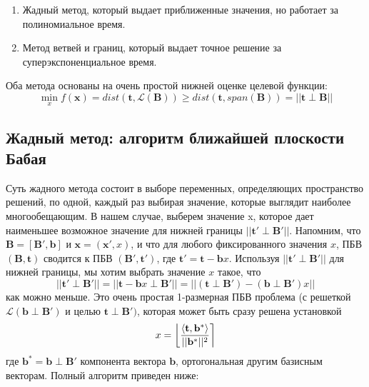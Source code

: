 \begin{enumerate}
\item Жадный метод, который выдает приближенные значения, но работает за полиномиальное время.
\item Метод ветвей и границ, который выдает точное решение за суперэкспоненциальное время.
\end{enumerate}

Оба метода основаны на очень простой нижней оценке целевой функции:
$$ \min \limits_{x}f(\mathbf{x}) = dist\left(\mathbf{t}, \mathcal{L}\left(\mathbf{B}\right)\right)\geq dist \left(\mathbf{t}, span\left(\mathbf{B}\right)\right) = ||\mathbf{t} \perp \mathbf{B} || $$

\subsection{Жадный метод: алгоритм ближайшей плоскости Бабая}

Суть жадного метода состоит в выборе переменных, определяющих пространство решений, по одной, каждый раз выбирая значение, которые выглядит наиболее многообещающим. В нашем случае, выберем значение x, которое дает наименьшее возможное значение для нижней границы $ ||\mathbf{t}' \perp \mathbf{B}' || $. Напомним, что $ \mathbf{B}=\left[\mathbf{B}', \mathbf{b}\right] $ и $ \mathbf{x}=\left(\mathbf{x}' ,x\right) $, и что для любого фиксированного значения $ x $, ПБВ $ (\mathbf{B}, \mathbf{t}) $ сводится к ПБВ $ (\mathbf{B}',\mathbf{t}') $, где $ \mathbf{t}'=\mathbf{t}-\mathbf{b}x $. Используя $ ||\mathbf{t}' \perp \mathbf{B}' || $ для нижней границы, мы хотим выбрать значение $ x $ такое, что 
$$ || \mathbf{t}' \perp \mathbf{B}' || = || \mathbf{t} - \mathbf{b}x \perp \mathbf{B}' || = || (\mathbf{t} \perp \mathbf{B}') - (\mathbf{b} \perp \mathbf{B}')x || $$ 
как можно меньше. Это очень простая 1-размерная ПБВ проблема (с решеткой $ \mathcal{L}\left(\mathbf{b} \perp \mathbf{B}'\right) $ и целью $ \mathbf{t} \perp \mathbf{B}') $, которая может быть сразу решена установкой
$$ x = \left\lfloor \left\langle \mathbf{t},\mathbf{b}^* \right\rangle \over ||\mathbf{b}^*||^2 \right\rceil $$
где $ \mathbf{b}^* = \mathbf{b} \perp \mathbf{B}' $ компонента вектора $ \mathbf{b} $, ортогональная другим базисным векторам. Полный алгоритм приведен ниже: \newline

\begin{algorithmic}

\end{algorithmic}

